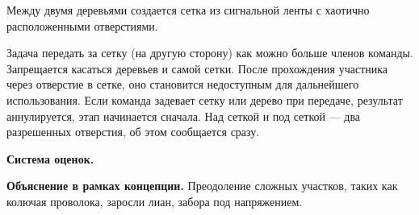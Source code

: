 
\par Между двумя деревьями создается сетка из сигнальной ленты с хаотично расположенными отверстиями.

\par Задача передать за сетку (на другую сторону) как можно больше членов команды. Запрещается касаться деревьев и самой сетки. После прохождения участника через отверстие в сетке, оно становится недоступным для дальнейшего использования. Если команда задевает сетку или дерево при передаче, результат аннулируется, этап начинается сначала. Над сеткой и под сеткой --- два разрешенных отверстия, об этом сообщается сразу.

\par \textbf{Система оценок.}

\par \textbf{Объяснение в рамках концепции.} Преодоление сложных участков, таких как колючая проволока, заросли лиан, забора под напряжением.